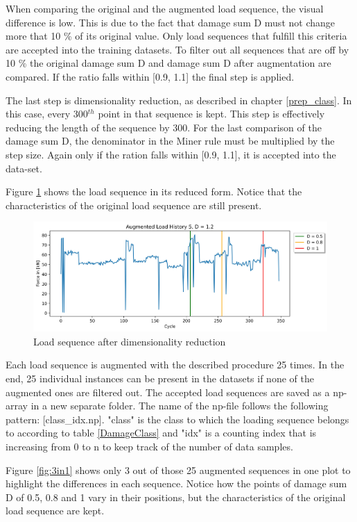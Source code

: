 When comparing the original and the augmented load sequence, the visual difference is low. This is due to the fact that damage sum D must not change more that 10 \% of its original value. Only load sequences that fulfill this criteria are accepted into the training datasets.
To filter out all sequences that are off by 10 \% the original damage sum D and damage sum D after augmentation are compared.
If the ratio falls within [0.9, 1.1] the final step is applied.


The last step is dimensionality reduction, as described in chapter \ref{prep_class}. In this case, every 300\(^{th}\) point in that sequence is kept. This step is effectively reducing the length of the sequence by 300. For the last comparison of the damage sum D, the denominator in the Miner rule must be multiplied by the step size. Again only if the ration falls within [0.9, 1.1], it is accepted into the data-set. 

Figure \ref{fig:Verlauf_5_reduced} shows the load sequence in its reduced form. Notice that the characteristics of the original load sequence are still present.
 
\begin{figure}[H]
	\centering
	\includegraphics[width=1\linewidth]{IMGs/Verlauf_5_reduced.jpg}
	\caption{Load sequence after dimensionality reduction}
	\label{fig:Verlauf_5_reduced}
\end{figure}

Each load sequence is augmented with the described procedure 25 times. In the end, 25 individual instances can be present in the datasets if none of the augmented ones are filtered out. 
The accepted load sequences are saved as a np-array in a new separate folder. The name of the np-file follows the following pattern: [class\_idx.np]. "class" is the class to which the loading sequence belongs to according to table \ref{DamageClass} and "idx" is a counting index that is increasing from 0 to n to keep track of the number of data samples.

Figure \ref{fig:3in1} shows only 3 out of those 25 augmented sequences in one plot to highlight the differences in each sequence.
Notice how the points of damage sum D of 0.5, 0.8 and 1 vary in their positions, but the characteristics of the original load sequence are kept.

